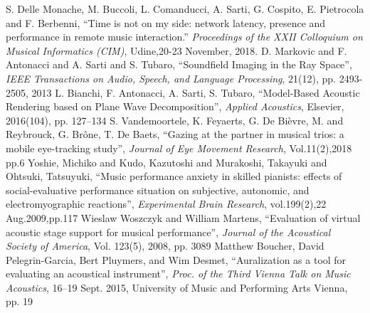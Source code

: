 S. Delle Monache, M. Buccoli, L. Comanducci, A. Sarti, G. Cospito, E. Pietrocola and F. Berbenni, ``Time is not on my side: network latency, presence and performance in remote music interaction.'' \emph{Proceedings of the XXII Colloquium on Musical Informatics (CIM)}, Udine,20-23 November, 2018.
%
D. Markovic and F. Antonacci and A. Sarti and S. Tubaro, ``Soundfield Imaging in the Ray Space'',
\emph{IEEE Transactions on Audio, Speech, and Language Processing}, 
21(12), 
pp. 2493-2505, 2013
%
L. Bianchi, F. Antonacci, A. Sarti, S. Tubaro,
``Model-Based Acoustic Rendering based on Plane Wave Decomposition'',
\emph{Applied Acoustics},
Elsevier,
2016(104),
pp. 127--134
S. Vandemoortele, K. Feyaerts, G. De Bi{\`e}vre, M. and Reybrouck, G. Br{\^o}ne, T. De Baets,
``Gazing at the partner in musical trios: a mobile eye-tracking study'',
\emph{Journal of Eye Movement Research}, 
Vol.11(2),2018
pp.6
Yoshie, Michiko
and Kudo, Kazutoshi
and Murakoshi, Takayuki
and Ohtsuki, Tatsuyuki, ``Music performance anxiety in skilled pianists: effects of social-evaluative performance situation on subjective, autonomic, and electromyographic reactions'',
\emph{Experimental Brain Research},
vol.199(2),22 Aug.2009,pp.117
%
Wieslaw Woszczyk and William Martens, ``Evaluation of virtual acoustic stage support for musical performance'', \emph{Journal of the Acoustical Society of America}, Vol. 123(5), 2008, pp. 3089
%
Matthew Boucher, David Pelegrin-Garcia, Bert Pluymers, and Wim Desmet, ``Auralization as a tool for evaluating an acoustical instrument'', \emph{Proc. of the Third Vienna Talk on Music Acoustics}, 16–19 Sept. 2015, University of Music and Performing Arts Vienna, pp. 19
%	
%	
%	
%	
%	
%	
%	